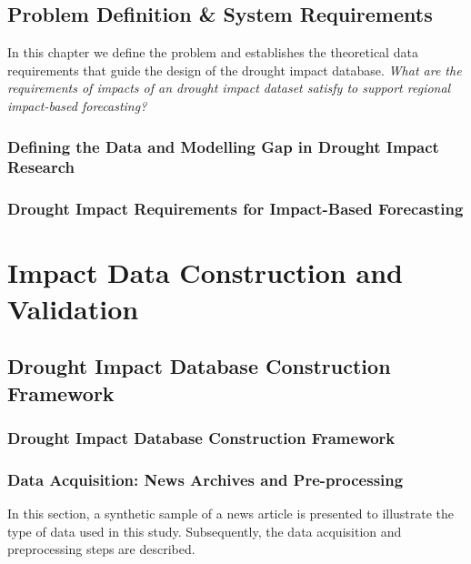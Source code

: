 \documentclass[11pt, a4paper, oneside]{book}
\begin{document}
\chapter{Problem Definition \& System Requirements}
\label{ch:problem_definition}

In this chapter we define the problem and establishes the theoretical data requirements that guide the design of the drought impact database. \textit{What are the requirements of impacts of an drought impact dataset satisfy to support regional impact-based forecasting?} 

\section{Defining the Data and Modelling Gap in Drought Impact Research}



\section{Drought Impact Requirements for Impact-Based Forecasting}



\part{Impact Data Construction and Validation}
\label{part A}

\chapter{Drought Impact Database Construction Framework}
\label{ch:llm_pipeline}

\section{Drought Impact Database Construction Framework}


\newpage
\section{Data Acquisition: News Archives and Pre-processing}
In this section, a synthetic sample of a news article is presented to illustrate the type of data used in this study. Subsequently, the data acquisition and preprocessing steps are described.
\end{document}
